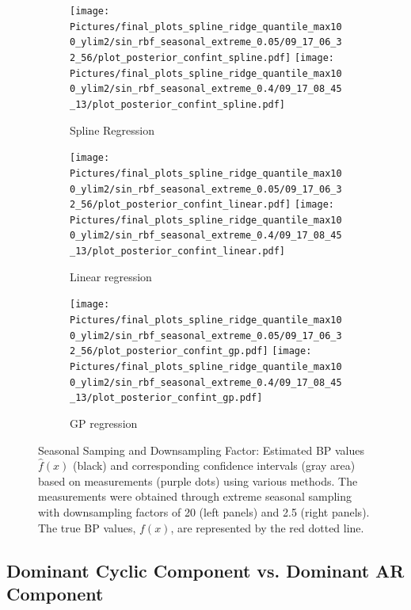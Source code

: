 \begin{figure}
\begin{subfigure}{\textwidth}
    \centering
    \texttt{[image: 
    Pictures/final\_plots\_spline\_ridge\_quantile\_max100\_ylim2/sin\_rbf\_seasonal\_extreme\_0.05/09\_17\_06\_32\_56/plot\_posterior\_confint\_spline.pdf]}
    \texttt{[image: 
    Pictures/final\_plots\_spline\_ridge\_quantile\_max100\_ylim2/sin\_rbf\_seasonal\_extreme\_0.4/09\_17\_08\_45\_13/plot\_posterior\_confint\_spline.pdf]}
  \caption{Spline Regression}
\end{subfigure}

\begin{subfigure}{\textwidth}
    \centering
    \texttt{[image: 
    Pictures/final\_plots\_spline\_ridge\_quantile\_max100\_ylim2/sin\_rbf\_seasonal\_extreme\_0.05/09\_17\_06\_32\_56/plot\_posterior\_confint\_linear.pdf]}
    \texttt{[image: 
        Pictures/final\_plots\_spline\_ridge\_quantile\_max100\_ylim2/sin\_rbf\_seasonal\_extreme\_0.4/09\_17\_08\_45\_13/plot\_posterior\_confint\_linear.pdf]}
  \caption{Linear regression }
\end{subfigure}

\begin{subfigure}{\textwidth}
    \centering
    \texttt{[image: 
    Pictures/final\_plots\_spline\_ridge\_quantile\_max100\_ylim2/sin\_rbf\_seasonal\_extreme\_0.05/09\_17\_06\_32\_56/plot\_posterior\_confint\_gp.pdf]}
    \texttt{[image: 
       Pictures/final\_plots\_spline\_ridge\_quantile\_max100\_ylim2/sin\_rbf\_seasonal\_extreme\_0.4/09\_17\_08\_45\_13/plot\_posterior\_confint\_gp.pdf]}
  \caption{GP regression}
\end{subfigure}\hfill

\caption[Seasonal Samping and Downsampling Factor Example 2]{Seasonal Samping and Downsampling Factor:
    Estimated BP values $\hat{f}(x)$ (black) and corresponding confidence intervals (gray area)
    based on measurements (purple dots) using various methods.
    The measurements were obtained through extreme seasonal sampling with downsampling
    factors of 20 (left panels) and 2.5 (right panels).
    The true BP values, $f(x)$, are represented by the red dotted line.}
\label{fig:ex-seasonal-sampling}
\end{figure}





\subsection{Dominant Cyclic Component vs. Dominant AR Component}
\label{subsec:dominant-cyclic-component-vs-dominant-ar-component}

